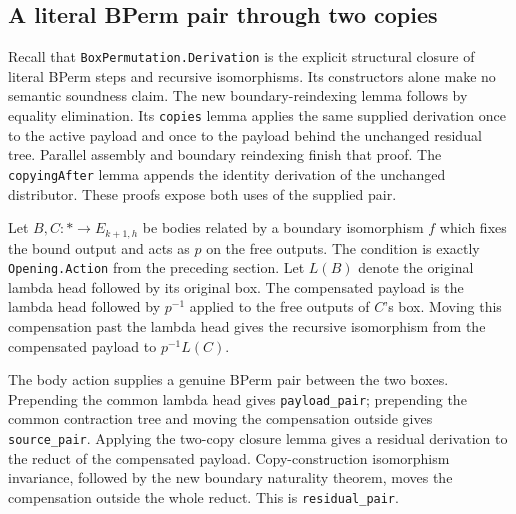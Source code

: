 \subsection{A literal BPerm pair through two copies}
Recall that \texttt{BoxPermutation.Derivation} is the explicit structural
closure of literal BPerm steps and recursive isomorphisms. Its constructors
alone make no semantic soundness claim. The new boundary-reindexing lemma
follows by equality elimination. Its \texttt{copies} lemma applies the same
supplied derivation once to the active payload and once to the payload behind
the unchanged residual tree. Parallel assembly and boundary reindexing finish
that proof. The \texttt{copyingAfter} lemma appends the identity derivation of
the unchanged distributor. These proofs expose both uses of the supplied pair.


Let $B,C:*\to E_{k+1,h}$ be bodies related by a boundary isomorphism $f$ which
fixes the bound output and acts as $p$ on the free outputs. The condition is
exactly \texttt{Opening.Action} from the preceding section. Let $L(B)$ denote
the original lambda head followed by its original box. The compensated payload
is the lambda head followed by $p^{-1}$ applied to the free outputs of $C$'s
box. Moving this compensation past the lambda head gives the recursive
isomorphism from the compensated payload to $p^{-1}L(C)$.

The body action supplies a genuine BPerm pair between the two boxes. Prepending
the common lambda head gives \texttt{payload\_pair}; prepending the common
contraction tree and moving the compensation outside gives
\texttt{source\_pair}. Applying the two-copy closure lemma gives a residual
derivation to the reduct of the compensated payload. Copy-construction
isomorphism invariance, followed by the new boundary naturality theorem, moves
the compensation outside the whole reduct. This is \texttt{residual\_pair}.


